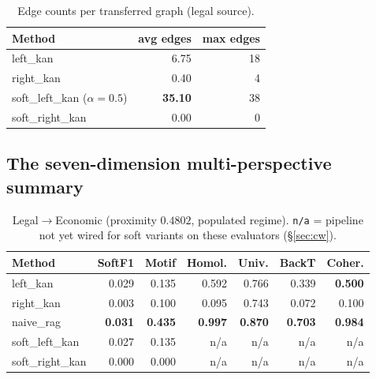 \documentclass[10pt,letterpaper]{article}
\begin{document}
\begin{table}[h]
\centering\small
\caption{Edge counts per transferred graph (legal source).}\label{tab:edges}
\begin{tabular}{lrr}
\toprule
Method & avg edges & max edges \\
\midrule
left\_kan  & 6.75 & 18 \\
right\_kan & 0.40 &  4 \\
soft\_left\_kan ($\alpha{=}0.5$) & \textbf{35.10} & 38 \\
soft\_right\_kan                  & 0.00  &  0 \\
\bottomrule
\end{tabular}
\end{table}

\subsection{The seven-dimension multi-perspective summary}

\begin{table}[h]
\centering\small
\caption{Legal${\to}$Economic (proximity $0.4802$, populated regime). \texttt{n/a} = pipeline not yet wired for soft variants on these evaluators (\S\ref{sec:cw}).}\label{tab:legal}
\begin{tabular}{lrrrrrr}
\toprule
Method & SoftF1 & Motif & Homol. & Univ. & BackT & Coher. \\
\midrule
left\_kan       & 0.029           & 0.135           & 0.592          & 0.766          & 0.339          & \textbf{0.500} \\
right\_kan      & 0.003           & 0.100           & 0.095          & 0.743          & 0.072          & 0.100 \\
naive\_rag      & \textbf{0.031}  & \textbf{0.435}  & \textbf{0.997} & \textbf{0.870} & \textbf{0.703} & \textbf{0.984} \\
soft\_left\_kan & 0.027           & 0.135           & n/a            & n/a            & n/a            & n/a            \\
soft\_right\_kan& 0.000           & 0.000           & n/a            & n/a            & n/a            & n/a            \\
\bottomrule
\end{tabular}
\end{table}
\end{document}
